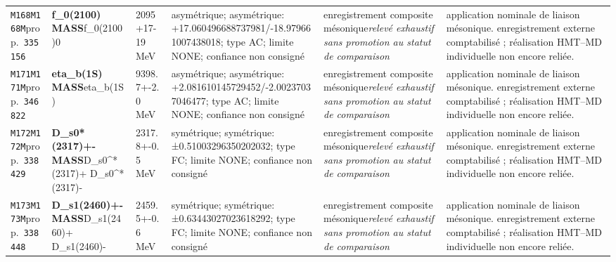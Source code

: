 \begin{landscape}
\begin{longtable}{L{1.85cm}L{4.45cm}L{2.35cm}L{4.05cm}L{3.35cm}L{7.15cm}}
\texttt{M168}\newline \texttt{M168M}\newline prop.\ \texttt{335156} & \textbf{f\_\allowbreak{}0(2100) MASS}\newline f\_\allowbreak{}0(2100)0 & 2095+17-19\,MeV & asymétrique; asymétrique: +17.060496688737981/-18.979661007438018; type AC; limite NONE; confiance non consigné & enregistrement composite mésonique\newline \emph{relevé exhaustif sans promotion au statut de comparaison} & application nominale de liaison mésonique. enregistrement externe comptabilisé ; réalisation HMT--MD individuelle non encore reliée. \\
\texttt{M171}\newline \texttt{M171M}\newline prop.\ \texttt{346822} & \textbf{eta\_\allowbreak{}b(1S) MASS}\newline eta\_\allowbreak{}b(1S) & 9398.7+-2.0\,MeV & asymétrique; asymétrique: +2.081610145729452/-2.00237037046477; type AC; limite NONE; confiance non consigné & enregistrement composite mésonique\newline \emph{relevé exhaustif sans promotion au statut de comparaison} & application nominale de liaison mésonique. enregistrement externe comptabilisé ; réalisation HMT--MD individuelle non encore reliée. \\
\texttt{M172}\newline \texttt{M172M}\newline prop.\ \texttt{338429} & \textbf{D\_\allowbreak{}s0*(2317)+- MASS}\newline D\_\allowbreak{}s0\textasciicircum{}*(2317)+ \textbar{}\allowbreak{} D\_\allowbreak{}s0\textasciicircum{}*(2317)- & 2317.8+-0.5\,MeV & symétrique; symétrique: ±0.51003296350202032; type FC; limite NONE; confiance non consigné & enregistrement composite mésonique\newline \emph{relevé exhaustif sans promotion au statut de comparaison} & application nominale de liaison mésonique. enregistrement externe comptabilisé ; réalisation HMT--MD individuelle non encore reliée. \\
\texttt{M173}\newline \texttt{M173M}\newline prop.\ \texttt{338448} & \textbf{D\_\allowbreak{}s1(2460)+- MASS}\newline D\_\allowbreak{}s1(2460)+ \textbar{}\allowbreak{} D\_\allowbreak{}s1(2460)- & 2459.5+-0.6\,MeV & symétrique; symétrique: ±0.63443027023618292; type FC; limite NONE; confiance non consigné & enregistrement composite mésonique\newline \emph{relevé exhaustif sans promotion au statut de comparaison} & application nominale de liaison mésonique. enregistrement externe comptabilisé ; réalisation HMT--MD individuelle non encore reliée. \\

\end{longtable}
\end{landscape}
